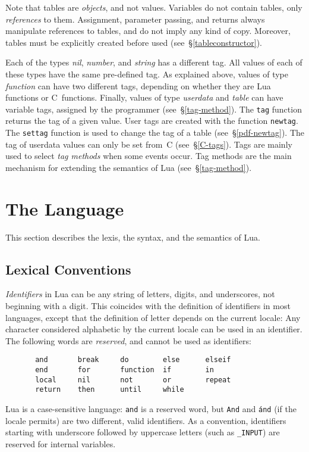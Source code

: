 \documentclass[11pt]{article}
\makeatletter
\newcommand{\See}[1]{\S\ref{#1}}
\newcommand{\see}[1]{(see~\See{#1})}
\newcommand{\M}[1]{{\rm\emph{#1}}}
\newcommand{\T}[1]{{\tt #1}}
\newcommand{\IndexEmph}[1]{\emph{#1}\index{#1@{\lowercase{#1}}}}
\makeatother
\begin{document}
Note that tables are \emph{objects}, and not values.
Variables do not contain tables, only \emph{references} to them.
Assignment, parameter passing, and returns always manipulate references
to tables, and do not imply any kind of copy.
Moreover, tables must be explicitly created before used
\see{tableconstructor}.

Each of the types \M{nil}, \M{number}, and \M{string} has a different tag.
All values of each of these types have the same pre-defined tag.
As explained above,
values of type \M{function} can have two different tags,
depending on whether they are Lua functions or C~functions.
Finally,
values of type \M{userdata} and \M{table} can have variable tags,
assigned by the programmer \see{tag-method}.
The \verb|tag| function returns the tag of a given value.
User tags are created with the function \verb|newtag|.
The \verb|settag| function
is used to change the tag of a table \see{pdf-newtag}.
The tag of userdata values can only be set from~C \see{C-tags}.
Tags are mainly used to select \emph{tag methods} when
some events occur.
Tag methods are the main mechanism for extending the
semantics of Lua \see{tag-method}.

\section{The Language}

This section describes the lexis, the syntax, and the semantics of Lua.


\subsection{Lexical Conventions} \label{lexical}

\IndexEmph{Identifiers} in Lua can be any string of letters,
digits, and underscores,
not beginning with a digit.
This coincides with the definition of identifiers in most languages,
except that
the definition of letter depends on the current locale:
Any character considered alphabetic by the current locale
can be used in an identifier.
The following words are \emph{reserved}, and cannot be used as identifiers:
\begin{verbatim}
       and       break     do        else      elseif
       end       for       function  if        in
       local     nil       not       or        repeat
       return    then      until     while
\end{verbatim}

Lua is a case-sensitive language:
\T{and} is a reserved word, but \T{And} and \T{\'and}
(if the locale permits) are two different, valid identifiers.
As a convention, identifiers starting with underscore followed by
uppercase letters (such as \verb|_INPUT|)
are reserved for internal variables.
\end{document}
